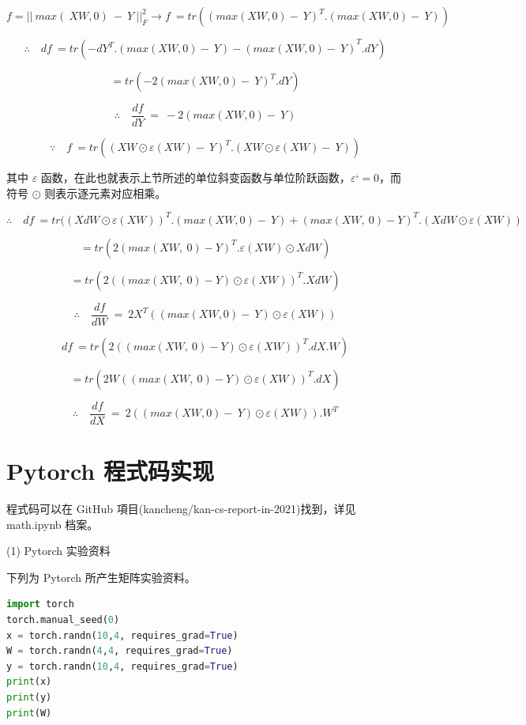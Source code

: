 \documentclass[11pt,UTF8]{ctexart}
\begin{document}
$$f={||\ max(\ XW, 0)\ -\ Y\ ||}_F^2 \rightarrow f\ =tr({(max(XW,0)-\ Y)}^T.(max(XW,0)-\ Y))$$


$$\therefore\quad df\ =tr({-{dY}^T.(max(XW,0)-\ Y)-(max(XW,0)-\ Y)}^T.dY)$$

$$=tr({-2(max(XW,0)-\ Y)}^T.dY)$$

$$\therefore\quad \frac{df}{dY}\ =\ -2(max(XW,0)-\ Y)$$

$$\because\quad  f\ =tr({(XW\odot\varepsilon(XW)-\ Y)}^T.(XW\odot\varepsilon(XW)-\ Y))$$

其中 $\varepsilon$ 函数，在此也就表示上节所述的单位斜变函数与单位阶跃函数，$\varepsilon‘= 0$，而符号 $\odot$ 则表示逐元素对应相乘。

$$\therefore\quad df\ =tr({(XdW\odot\varepsilon(XW))}^T.(max(XW,0)-\ Y)+{(max(XW,\ 0)-Y)}^T.(XdW\odot\varepsilon(XW))$$

$$=tr({2(max(XW,\ 0)-Y)}^T.\varepsilon(XW)\odot XdW)$$

$$=tr({2((max(XW,\ 0)-Y)\odot\varepsilon(XW))}^T.XdW)$$

$$\therefore\quad \frac{df}{dW}\ =\ 2X^T((max(XW,0)-\ Y)\odot\varepsilon(XW))$$

$$df\ =tr(2{((max(XW,\ 0)-Y)\odot\varepsilon(XW))}^T.dX.W)$$

$$=tr(2W{((max(XW,\ 0)-Y)\odot\varepsilon(XW))}^T.dX)$$

$$\therefore\quad \frac{df}{dX}\ =\ 2((max(XW,0)-\ Y) \odot\varepsilon(XW)).W^T$$
\textit{}
\newpage

\section{Pytorch 程式码实现}

程式码可以在 GitHub 項目(kancheng/kan-cs-report-in-2021)找到，详见 math.ipynb 档案。


(1) Pytorch 实验资料

下列为 Pytorch 所产生矩阵实验资料。
\newline

	\begin{lstlisting}[language={python}]
import torch
torch.manual_seed(0)
x = torch.randn(10,4, requires_grad=True)
W = torch.randn(4,4, requires_grad=True)
y = torch.randn(10,4, requires_grad=True)
print(x)
print(y)
print(W)
	\end{lstlisting}
	
\end{document}

